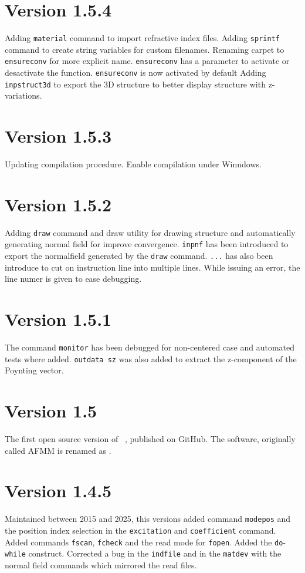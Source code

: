 \section{Version 1.5.4}
Adding \lstinline!material! command to import refractive index files.
Adding \lstinline!sprintf! command to create string variables for custom filenames.
Renaming carpet to \lstinline!ensureconv! for more explicit name. \lstinline!ensureconv! has a parameter to activate or desactivate the function. \lstinline!ensureconv! is now activated by default
Adding \lstinline!inpstruct3d! to export the 3D structure to better display structure with z-variations. 

\section{Version 1.5.3}
Updating compilation procedure. Enable compilation under Winndows.

\section{Version 1.5.2}
Adding \lstinline!draw! command and \textsf{draw} utility for drawing structure and automatically generating normal field for improve convergence.
\lstinline!inpnf! has been introduced to export the normalfield generated by the \lstinline!draw! command.
\lstinline!...! has also been introduce to cut on instruction line into multiple lines. While issuing an error, the line numer is given to ease debugging.

\section{Version 1.5.1}
The command \lstinline!monitor! has been debugged for non-centered case and automated tests where added. \lstinline!outdata sz! was also added to extract the z-component of the Poynting vector.


\section{Version 1.5}
The first open source version of \afmm\ , published on GitHub. The software, originally called \textsf{AFMM} is renamed as \afmm .

\section{Version 1.4.5}
Maintained between 2015 and 2025, this versions added command \lstinline!modepos! and the position index selection in the \lstinline!excitation! and \lstinline!coefficient! command. Added commands  \lstinline!fscan!, \lstinline!fcheck! and the read mode for  \lstinline!fopen!. Added the \lstinline!do!-\lstinline!while! construct.
Corrected a bug in the \lstinline!indfile! and in the \lstinline!matdev! with the normal field commands which mirrored the read files.

